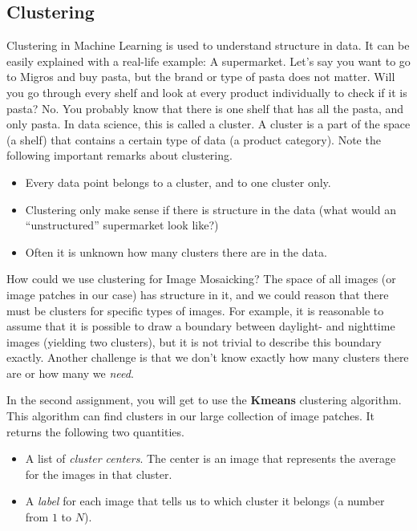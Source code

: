 \documentclass[]{article}
\begin{document}
	\subsection{Clustering}
		Clustering in Machine Learning is used to understand structure in data. 
		It can be easily explained with a real-life example: A supermarket.
		Let's say you want to go to Migros and buy pasta, but the brand or type of pasta does not matter.
		Will you go through every shelf and look at every product individually to check if it is pasta? 
		No. 
		You probably know that there is one shelf that has all the pasta, and only pasta.
		In data science, this is called a cluster.
		A cluster is a part of the space (a shelf) that contains a certain type of data (a product category).
		Note the following important remarks about clustering.
		\begin{itemize}
			\item Every data point belongs to a cluster, and to one cluster only.
			\item Clustering only make sense if there is structure in the data (what would an ``unstructured'' supermarket look like?)
			\item Often it is unknown how many clusters there are in the data.
		\end{itemize}
		How could we use clustering for Image Mosaicking?
		The space of all images (or image patches in our case) has structure in it, and we could reason that there must be clusters for specific types of images. For example, it is reasonable to assume that it is possible to draw a boundary between daylight- and nighttime images (yielding two clusters), but it is not trivial to describe this boundary exactly.
		Another challenge is that we don't know exactly how many clusters there are or how many we \emph{need}.
		
		In the second assignment, you will get to use the \textbf{Kmeans} clustering algorithm. 
		This algorithm can find clusters in our large collection of image patches.
		It returns the following two quantities.
		\begin{itemize}
			\item A list of \emph{cluster centers}. 
			The center is an image that represents the average for the images in that cluster.
			\item A \emph{label} for each image that tells us to which cluster it belongs (a number from $1$ to $N$).
		\end{itemize}
		
		
		
\end{document}
